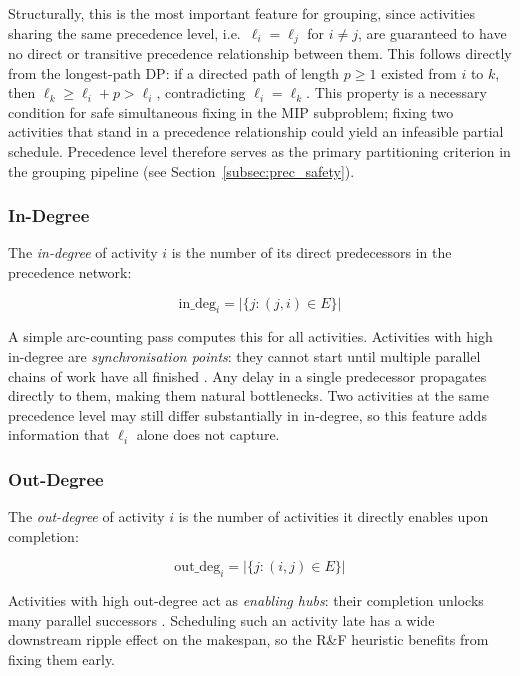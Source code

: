 Structurally, this is the most important feature for grouping, since
activities sharing the same precedence level, i.e.\
$\ell_i = \ell_j$ for $i \neq j$, are guaranteed to have no
direct or transitive precedence relationship between them.
This follows directly from the longest-path DP: if a directed
path of length $p \geq 1$ existed from $i$ to $k$, then
$\ell_k \geq \ell_i + p > \ell_i$, contradicting
$\ell_i = \ell_k$. This property is a necessary condition
for safe simultaneous fixing in the MIP subproblem; fixing
two activities that stand in a precedence relationship could
yield an infeasible partial schedule. Precedence level
therefore serves as the primary partitioning criterion in
the grouping pipeline (see Section~\ref{subsec:prec_safety}).

\subsubsection*{In-Degree}
\label{subsubsec:in_degree}

The \textit{in-degree} of activity $i$ is the number of its
direct predecessors in the precedence network:

\begin{equation}
    \mathrm{in\_deg}_i = |\{j : (j,i) \in E\}|
    \label{eq:in_deg}
\end{equation}

A simple arc-counting pass computes this for all activities.
Activities with high in-degree are \textit{synchronisation
points}: they cannot start until multiple parallel chains
of work have all finished \parencite{Demeulemeester2002}. Any
delay in a single predecessor propagates directly to them,
making them natural bottlenecks. Two activities at the same
precedence level may still differ substantially in in-degree,
so this feature adds information that $\ell_i$ alone does not
capture.

\subsubsection*{Out-Degree}
\label{subsubsec:out_degree}

The \textit{out-degree} of activity $i$ is the number of
activities it directly enables upon completion:

\begin{equation}
    \mathrm{out\_deg}_i = |\{j : (i,j) \in E\}|
    \label{eq:out_deg}
\end{equation}

Activities with high out-degree act as \textit{enabling hubs}:
their completion unlocks many parallel successors
\parencite{Demeulemeester2002}. Scheduling such an activity
late has a wide downstream ripple effect on the makespan,
so the R\&F heuristic benefits from fixing them early.
